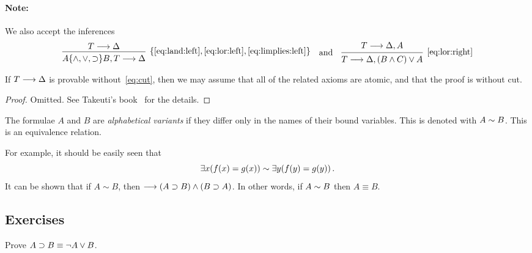 \documentclass[11pt,a4paper]{article}
\begin{document}
\paragraph{Note:}
We also accept the inferences
\begin{equation*}
    \begin{prooftree}
        \hypo{T\seq \Delta}
        \infer1[\(\set{\eqref{eq:land:left},\eqref{eq:lor:left},\eqref{eq:limplies:left}}\)]{A\set{\land,\lor,\limplies } B, T\seq \Delta}
    \end{prooftree}
    \quad\text{and}\quad
    \begin{prooftree}
        \hypo{T\seq \Delta, A}
        \infer1[\eqref{eq:lor:right}]{T\seq\Delta, \arcs{B\land C}\lor A}
    \end{prooftree}
\end{equation*}

\begin{proposition}\label{prop:if provable, then atomic}
    If \(T\longrightarrow\Delta\) is provable without~\eqref{eq:cut},
    then we may assume that all of the related axioms are atomic,
    and that the proof is without cut.
\end{proposition}

\begin{proof}
    Omitted. See Takeuti's book~\cite[14-17]{Takeuti-1987} for the details.
\end{proof}

\begin{definition}\label{def:alphabetical variants}
    The formulae \(A\) and \(B\) are \emph{alphabetical variants}
    if they differ only in the names of their bound variables.
    This is denoted with \(A\sim{B}\). This is an equivalence relation.
\end{definition}

For example, it should be easily seen that
\begin{equation*}
    \exists x(f(x) = g(x)) \sim\exists y(f(y) = g(y))\,.
\end{equation*}
It can be shown that if \(A\sim B\), then \(\longrightarrow(A\supset B)\land(B\supset A)\).
In other words, if \(A\sim B\) then \(A\equiv B\).



\subsection{Exercises}

\begin{exercise}[Exercise 2.5.2]\label{exe:2.5.2}
    Prove \(A\supset B \equiv \lnot A\lor B\).
\end{exercise}
\end{document}

